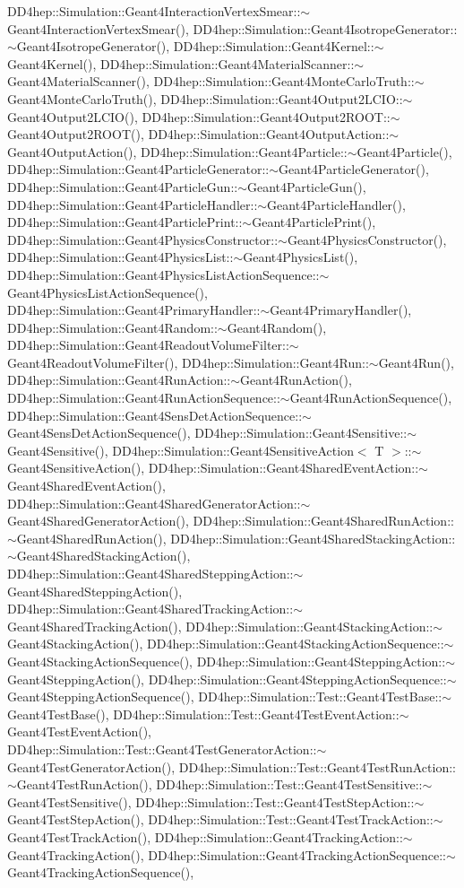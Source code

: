 DD4hep::Simulation::Geant4InteractionVertexSmear::$\sim$Geant4InteractionVertexSmear(), DD4hep::Simulation::Geant4IsotropeGenerator::$\sim$Geant4IsotropeGenerator(), DD4hep::Simulation::Geant4Kernel::$\sim$Geant4Kernel(), DD4hep::Simulation::Geant4MaterialScanner::$\sim$Geant4MaterialScanner(), DD4hep::Simulation::Geant4MonteCarloTruth::$\sim$Geant4MonteCarloTruth(), DD4hep::Simulation::Geant4Output2LCIO::$\sim$Geant4Output2LCIO(), DD4hep::Simulation::Geant4Output2ROOT::$\sim$Geant4Output2ROOT(), DD4hep::Simulation::Geant4OutputAction::$\sim$Geant4OutputAction(), DD4hep::Simulation::Geant4Particle::$\sim$Geant4Particle(), DD4hep::Simulation::Geant4ParticleGenerator::$\sim$Geant4ParticleGenerator(), DD4hep::Simulation::Geant4ParticleGun::$\sim$Geant4ParticleGun(), DD4hep::Simulation::Geant4ParticleHandler::$\sim$Geant4ParticleHandler(), DD4hep::Simulation::Geant4ParticlePrint::$\sim$Geant4ParticlePrint(), DD4hep::Simulation::Geant4PhysicsConstructor::$\sim$Geant4PhysicsConstructor(), DD4hep::Simulation::Geant4PhysicsList::$\sim$Geant4PhysicsList(), DD4hep::Simulation::Geant4PhysicsListActionSequence::$\sim$Geant4PhysicsListActionSequence(), DD4hep::Simulation::Geant4PrimaryHandler::$\sim$Geant4PrimaryHandler(), DD4hep::Simulation::Geant4Random::$\sim$Geant4Random(), DD4hep::Simulation::Geant4ReadoutVolumeFilter::$\sim$Geant4ReadoutVolumeFilter(), DD4hep::Simulation::Geant4Run::$\sim$Geant4Run(), DD4hep::Simulation::Geant4RunAction::$\sim$Geant4RunAction(), DD4hep::Simulation::Geant4RunActionSequence::$\sim$Geant4RunActionSequence(), DD4hep::Simulation::Geant4SensDetActionSequence::$\sim$Geant4SensDetActionSequence(), DD4hep::Simulation::Geant4Sensitive::$\sim$Geant4Sensitive(), DD4hep::Simulation::Geant4SensitiveAction$<$ T $>$::$\sim$Geant4SensitiveAction(), DD4hep::Simulation::Geant4SharedEventAction::$\sim$Geant4SharedEventAction(), DD4hep::Simulation::Geant4SharedGeneratorAction::$\sim$Geant4SharedGeneratorAction(), DD4hep::Simulation::Geant4SharedRunAction::$\sim$Geant4SharedRunAction(), DD4hep::Simulation::Geant4SharedStackingAction::$\sim$Geant4SharedStackingAction(), DD4hep::Simulation::Geant4SharedSteppingAction::$\sim$Geant4SharedSteppingAction(), DD4hep::Simulation::Geant4SharedTrackingAction::$\sim$Geant4SharedTrackingAction(), DD4hep::Simulation::Geant4StackingAction::$\sim$Geant4StackingAction(), DD4hep::Simulation::Geant4StackingActionSequence::$\sim$Geant4StackingActionSequence(), DD4hep::Simulation::Geant4SteppingAction::$\sim$Geant4SteppingAction(), DD4hep::Simulation::Geant4SteppingActionSequence::$\sim$Geant4SteppingActionSequence(), DD4hep::Simulation::Test::Geant4TestBase::$\sim$Geant4TestBase(), DD4hep::Simulation::Test::Geant4TestEventAction::$\sim$Geant4TestEventAction(), DD4hep::Simulation::Test::Geant4TestGeneratorAction::$\sim$Geant4TestGeneratorAction(), DD4hep::Simulation::Test::Geant4TestRunAction::$\sim$Geant4TestRunAction(), DD4hep::Simulation::Test::Geant4TestSensitive::$\sim$Geant4TestSensitive(), DD4hep::Simulation::Test::Geant4TestStepAction::$\sim$Geant4TestStepAction(), DD4hep::Simulation::Test::Geant4TestTrackAction::$\sim$Geant4TestTrackAction(), DD4hep::Simulation::Geant4TrackingAction::$\sim$Geant4TrackingAction(), DD4hep::Simulation::Geant4TrackingActionSequence::$\sim$Geant4TrackingActionSequence(), 